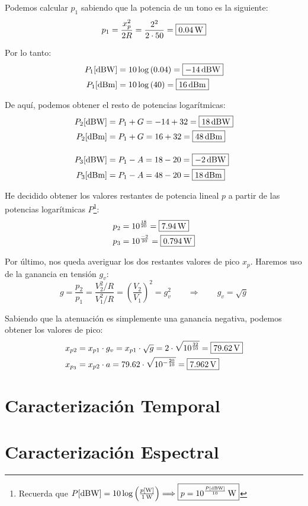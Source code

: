 \documentclass[a4paper]{book}
\begin{document}
Podemos calcular $p_1$ sabiendo que la potencia de un tono es la siguiente:
\[ p_1 = \frac{x_p^2}{2R} = \frac{2^2}{2 \cdot 50} = \boxed{0.04\operatorname{W} }\]

Por lo tanto:
\begin{align*}
	P_1 [\operatorname{dBW}] &= 10 \log \left( 0.04 \right) = \boxed{-14\operatorname{dBW}} \\ 
	P_1 [\operatorname{dBm}] &= 10 \log \left( 40 \right) = \boxed{16\operatorname{dBm}}
\end{align*}

De aquí, podemos obtener el resto de potencias logarítmicas:
\begin{align*}
	P_2 [\operatorname{dBW}] &= P_1 + G = -14 + 32 = \boxed{18\operatorname{dBW}} \\ 
	P_2 [\operatorname{dBm}] &= P_1 + G = 16 + 32  = \boxed{48\operatorname{dBm}}\\[10pt]
	P_3 [\operatorname{dBW}] &= P_1 - A = 18 - 20  = \boxed{-2\operatorname{dBW}} \\ 
	P_3 [\operatorname{dBm}] &= P_1 - A = 48 - 20  = \boxed{18\operatorname{dBm}}
\end{align*}

He decidido obtener los valores restantes de potencia lineal $p$ a partir de las potencias logarítmicas $P$\footnote{Recuerda que $P[\operatorname{dBW} ]=10 \log \left( \frac{p[\operatorname{W} ]}{1\operatorname{W}} \right) \Longrightarrow \boxed{p =10^{\frac{P[\operatorname{dBW} ]}{10}}\operatorname{W}}$}:
\begin{align*}
	p_2 &= 10^{\frac{18}{20}} = \boxed{7.94\operatorname{W}} \\ 
	p_3 &= 10^{\frac{-2}{20}} = \boxed{0.794\operatorname{W}}
\end{align*}

Por último, nos queda averiguar los dos restantes valores de pico $x_p$. Haremos uso de la ganancia en tensión $g_v$:
\[ g = \frac{p_2}{p_1} = \frac{V^2_2 / R}{V^2_1 / R} = \left( \frac{V_2}{V_1} \right)^2 = g_v^2 \qquad \Longrightarrow \qquad g_v = \sqrt{g} \]

Sabiendo que la atenuación es simplemente una ganancia negativa, podemos obtener los valores de pico:
\begin{align*}
	x_{p2} &= x_{p1} \cdot g_v = x_{p1} \cdot \sqrt{g} = 2 \cdot \sqrt{10^{\frac{32}{10}}} = \boxed{79.62\operatorname{V}}\\ 
	x_{p_3} &= x_{p2} \cdot a = 79.62 \cdot \sqrt{10^{-\frac{20}{10}}} = \boxed{7.962\operatorname{V}}
\end{align*}

\section{Caracterización Temporal}
\section{Caracterización Espectral}
\end{document}
